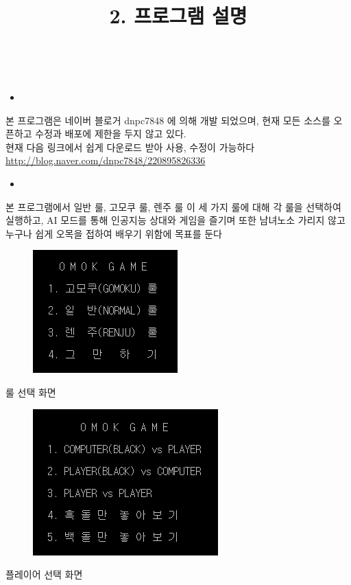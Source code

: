 \documentclass[a4paper, 11pt]{article}
\begin{document}
	\newpage
	\title{\textbf{\Huge2. 프로그램 설명}}\\
	\begin{itemize}
		\item {} 
	\end{itemize}
	{\Large
	본 프로그램은 네이버 블로거 dnpc7848 에 의해 개발 되었으며, 현재 모든 소스를 오픈하고 수정과 배포에 제한을 두지 않고 있다.\\
	현재 다음 링크에서 쉽게 다운로드 받아 사용, 수정이 가능하다\\
	\url{http://blog.naver.com/dnpc7848/220895826336}
	}
	\begin{itemize}
		\item {}
	\end{itemize}
	{\Large
		본 프로그램에서 일반 룰, 고모쿠 룰, 렌주 룰  이 세 가지 룰에 대해 각 룰을 선택하여 실행하고, AI 모드를 통해 인공지능 상대와 게임을 즐기며 또한 남녀노소 가리지 않고 누구나 쉽게 오목을 접하여 배우기 위함에 목표를 둔다
	}
	\newpage
	\begin{figure}[h] %
		\begin{center}
			\includegraphics[width=0.5\linewidth]{first.png}
		\end{center}
		\label{fig:long}
		\label{fig:onecol}
	\end{figure}
\begin{center}
		{\Large 룰 선택 화면}
\end{center}




\begin{figure}[h] %
	\begin{center}
		\includegraphics[width=0.5\linewidth]{second.png}
	\end{center}
	\label{fig:long}
	\label{fig:onecol}
\end{figure}
\begin{center}
	{\Large 플레이어 선택 화면}
\end{center}
\end{document}
